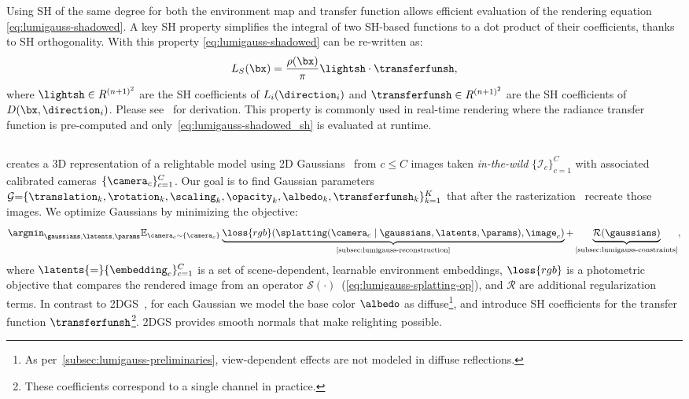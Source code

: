       Using SH of the same degree for both the environment map and transfer
      function allows efficient evaluation of the rendering equation
      \cref{eq:lumigauss-shadowed}.
      A key SH property simplifies the integral of two SH-based functions to a
      dot product of their coefficients, thanks to SH orthogonality.
      With this property \cref{eq:lumigauss-shadowed} can be re-written as:
      \begin{equation}
        \label{eq:lumigauss-shadowed_sh}
        L_{S}(\bx) = \frac{\rho(\bx)}{\pi} \lightsh \cdot \transferfunsh,
        \end{equation} where $\lightsh \in R^{(n+1)^2}$ are the SH
        coefficients of $L_i(\direction_i)$ and $\transferfunsh \in
        R^{(n+1)^2}$ are the SH coefficients of $D(\bx, \direction_i)$.
      Please see~\cite{slomp2006gentle, green2003grittydetail} for derivation.
      This property is commonly used in real-time rendering where the radiance
      transfer function is pre-computed and
      only~\cref{eq:lumigauss-shadowed_sh} is evaluated at runtime.

  \subsection{\lumigauss}
    \lumigauss creates a 3D representation of a relightable model using 2D Gaussians~\cite{huang20242d} from $c\leq C$ images taken \textit{in-the-wild}  $\{\mathcal{I}_c\}_{c=1}^C$ with associated calibrated cameras~$\{\camera_c\}_{c=1}^C$.
    Our goal is to find Gaussian parameters
    $\mathcal{G}{=}\{\translation_k,\rotation_k,\scaling_k,\opacity_k,
    \albedo_k,\transferfunsh_k\}^K_{k=1}$ that after the
    rasterization~\cite{kerbl20233d} recreate those images.
    We optimize Gaussians by minimizing the objective:
    \begin{equation}
      \argmin_{\gaussians, \latents,\params} \mathbb{E}_{\camera_c\sim \{\camera_c\}} \underbrace{\loss{rgb}\!\left(\splatting(\camera_c\;|\;\gaussians, \latents, \params), \image_c\right)}_{\text{\cref{subsec:lumigauss-reconstruction}}}  + \underbrace{\mathcal{R}(\gaussians)}_{\text{\cref{subsec:lumigauss-constraints}}},
    \end{equation}
    where $\latents{=}\{\embedding_c\}_{c=1}^C$ is a set of scene-dependent, learnable environment embeddings, $\loss{rgb}$ is a photometric objective that compares the rendered image from an operator $\mathcal{S}(\cdot)$~(\cref{eq:lumigauss-splatting-op}), and $\mathcal{R}$ are additional regularization terms.
    In contrast to 2DGS~\cite{huang20242d}, for each Gaussian we model the
    base color $\albedo$ as diffuse\footnote{As
    per~\cref{subsec:lumigauss-preliminaries}, view-dependent effects are not
    modeled in diffuse reflections.
    }, and introduce SH coefficients for the transfer function $\transferfunsh$\footnote{These coefficients correspond to a single channel in practice.}. 2DGS provides smooth normals that make relighting possible.


